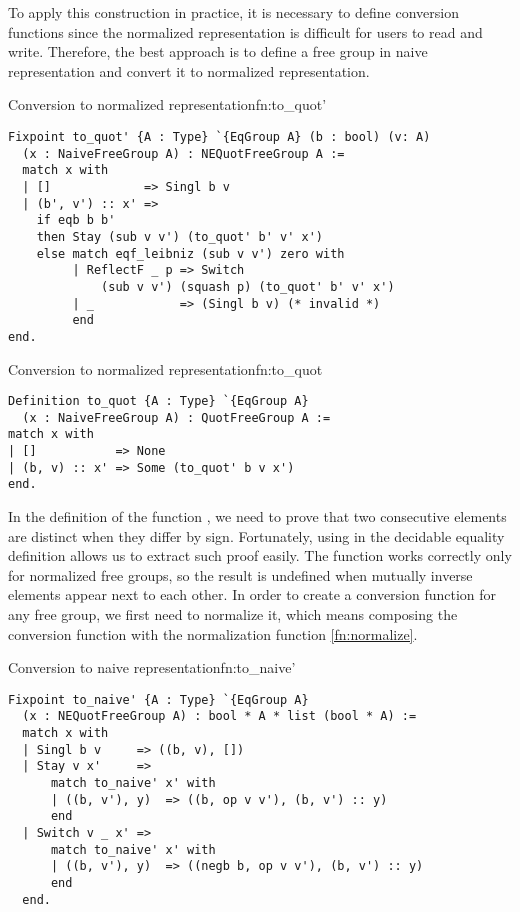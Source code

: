 To apply this construction in practice, it is necessary to define conversion functions since the normalized representation is difficult for users to read and write. Therefore, the best approach is to define a free group in naive representation and convert it to normalized representation.
\begin{func}{Conversion to normalized representation}{fn:to_quot'}
\begin{verbatim}
Fixpoint to_quot' {A : Type} `{EqGroup A} (b : bool) (v: A) 
  (x : NaiveFreeGroup A) : NEQuotFreeGroup A :=
  match x with 
  | []             => Singl b v
  | (b', v') :: x' => 
    if eqb b b' 
    then Stay (sub v v') (to_quot' b' v' x')
    else match eqf_leibniz (sub v v') zero with
         | ReflectF _ p => Switch 
             (sub v v') (squash p) (to_quot' b' v' x')
         | _            => (Singl b v) (* invalid *)
         end
end.
\end{verbatim}
\end{func}
\begin{func}{Conversion to normalized representation}{fn:to_quot}
\begin{verbatim}
Definition to_quot {A : Type} `{EqGroup A} 
  (x : NaiveFreeGroup A) : QuotFreeGroup A :=
match x with
| []           => None
| (b, v) :: x' => Some (to_quot' b v x')
end.
\end{verbatim}
\end{func}
In the definition of the function , we need to prove that two consecutive elements are distinct when they differ by sign. Fortunately, using  in the decidable equality definition allows us to extract such proof easily. The  function works correctly only for normalized free groups, so the result is undefined when mutually inverse elements appear next to each other. In order to create a conversion function for any free group, we first need to normalize it, which means composing the conversion function with the normalization function \ref{fn:normalize}.
\begin{func}{Conversion to naive representation}{fn:to_naive'}
\begin{verbatim}
Fixpoint to_naive' {A : Type} `{EqGroup A} 
  (x : NEQuotFreeGroup A) : bool * A * list (bool * A) :=
  match x with 
  | Singl b v     => ((b, v), [])
  | Stay v x'     => 
      match to_naive' x' with
      | ((b, v'), y)  => ((b, op v v'), (b, v') :: y)
      end
  | Switch v _ x' => 
      match to_naive' x' with
      | ((b, v'), y)  => ((negb b, op v v'), (b, v') :: y)
      end
  end.
\end{verbatim}
\end{func}

